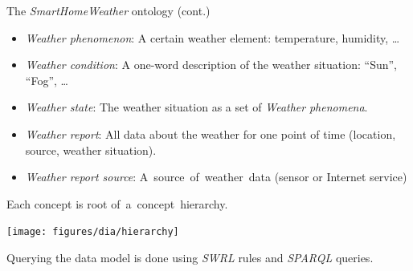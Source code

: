 \documentclass[final,hyperref={pdfpagelabels=true}]{beamer}
\begin{document}
\begin{frame}[fragile]
\begin{columns}[t]
\begin{column}{.45\textwidth}
\begin{block}{The \emph{SmartHomeWeather} ontology (cont.)}
	\begin{itemize}
  	  \item \emph{Weather phenomenon}: A certain weather
		  element: temperature, humidity, …
	  \item \emph{Weather condition}: A one-word description of the
		  weather situation: ``Sun'', ``Fog'', …
	  \item \emph{Weather state}: The weather situation as a
		  set of \emph{Weather} \emph{phenomena}.
	  \item \emph{Weather report}: All data about the weather for one
		  point of time (location, source, weather situation).
	\end{itemize}
	\hspace{-1.05cm}\begin{minipage}{\dimexpr.45\textwidth}
	  \vspace{.3em}
	  \begin{itemize}
  	    \item \emph{Weather report source}: \mbox{A source of weather data}
	  	  (sensor or Internet service)
	  \end{itemize}

	  \vspace{.5em}

	  \hfill\begin{minipage}{\dimexpr\textwidth-1.05cm}
	  \raggedright
	  Each concept is root \mbox{of a concept hierarchy.}
	  \end{minipage}
	\end{minipage}
	\begin{minipage}{\dimexpr.5\textwidth}
	  \centering
	  \vspace{2em}
  	  \texttt{[image: figures/dia/hierarchy]}
	\end{minipage}

	\vspace{2em}

	Querying the data model is done using \emph{SWRL} rules and \emph{SPARQL} queries.

	\vspace{10mm}
	\begin{minipage}[t]{.5\textwidth}
	\raggedright
\end{minipage}
\end{block}
\end{column}
\end{columns}
\end{frame}
\end{document}
